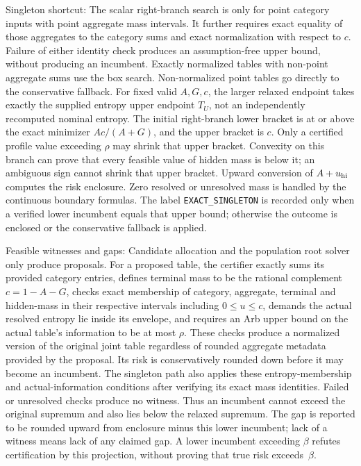 Singleton shortcut: The scalar right-branch search is only for point category inputs with point aggregate mass intervals. It further requires exact equality of those aggregates to the category sums and exact normalization with respect to $c$. Failure of either identity check produces an assumption-free upper bound, without producing an incumbent. Exactly normalized tables with non-point aggregate sums use the box search. Non-normalized point tables go directly to the conservative fallback. For fixed valid $A,G,c$, the larger relaxed endpoint takes exactly the supplied entropy upper endpoint $T_U$, not an independently recomputed nominal entropy. The initial right-branch lower bracket is at or above the exact minimizer $Ac/(A+G)$, and the upper bracket is $c$. Only a certified profile value exceeding $\rho$ may shrink that upper bracket. Convexity on this branch can prove that every feasible value of hidden mass is below it; an ambiguous sign cannot shrink that upper bracket. Upward conversion of $A+u_{\rm hi}$ computes the risk enclosure. Zero resolved or unresolved mass is handled by the continuous boundary formulas. The label \texttt{EXACT\_SINGLETON} is recorded only when a verified lower incumbent equals that upper bound; otherwise the outcome is enclosed or the conservative fallback is applied.

Feasible witnesses and gaps: Candidate allocation and the population root solver only produce proposals. For a proposed table, the certifier exactly sums its provided category entries, defines terminal mass to be the rational complement $c=1-A-G$, checks exact membership of category, aggregate, terminal and hidden-mass in their respective intervals including $0\le u\le c$, demands the actual resolved entropy lie inside its envelope, and requires an Arb upper bound on the actual table's information to be at most $\rho$. These checks produce a normalized version of the original joint table regardless of rounded aggregate metadata provided by the proposal. Its risk is conservatively rounded down before it may become an incumbent. The singleton path also applies these entropy-membership and actual-information conditions after verifying its exact mass identities. Failed or unresolved checks produce no witness. Thus an incumbent cannot exceed the original supremum and also lies below the relaxed supremum. The gap is reported to be rounded upward from enclosure minus this lower incumbent; lack of a witness means lack of any claimed gap. A lower incumbent exceeding $\beta$ refutes certification by this projection, without proving that true risk exceeds~$\beta$.

